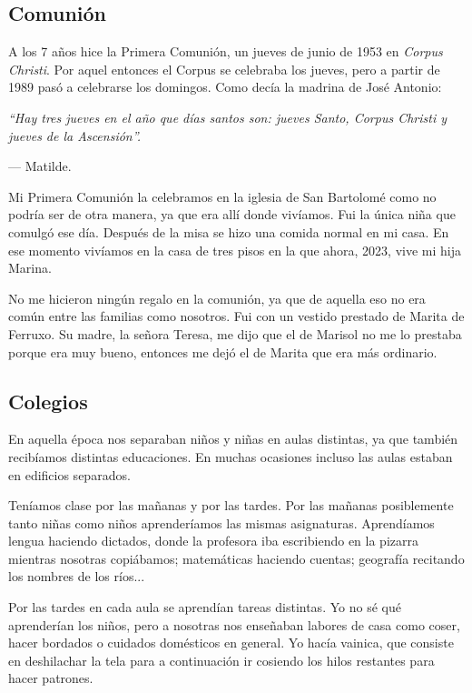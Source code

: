 \documentclass[12pt,a5paper]{book}
\begin{document}
\subsection*{Comunión}

A los 7 años hice la Primera Comunión, un jueves de junio de 1953 en \textit{Corpus Christi}. Por aquel entonces el Corpus se celebraba los jueves, pero a partir de 1989 pasó a celebrarse los domingos. Como decía la madrina de José Antonio:
\begin{center}
\textit{``Hay tres jueves en el año que días santos son: jueves Santo, Corpus Christi y jueves de la Ascensión''.}
\begin{flushright}
  — Matilde.
\end{flushright}
\end{center}

Mi Primera Comunión la celebramos en la iglesia de San Bartolomé como no podría ser de otra manera, ya que era allí donde vivíamos. Fui la única niña que comulgó ese día. Después de la misa se hizo una comida normal en mi casa. En ese momento vivíamos en la casa de tres pisos en la que ahora, 2023, vive mi hija Marina.

No me hicieron ningún regalo en la comunión, ya que de aquella eso no era común entre las familias como nosotros. Fui con un vestido prestado de Marita de Ferruxo. Su madre, la señora Teresa, me dijo que el de Marisol no me lo prestaba porque era muy bueno, entonces me dejó el de Marita que era más ordinario.


\subsection*{Colegios}

En aquella época nos separaban niños y niñas en aulas distintas, ya que también recibíamos distintas educaciones. En muchas ocasiones incluso las aulas estaban en edificios separados. 

Teníamos clase por las mañanas y por las tardes. Por las mañanas posiblemente tanto niñas como niños aprenderíamos las mismas asignaturas. Aprendíamos lengua haciendo dictados, donde la profesora iba escribiendo en la pizarra mientras nosotras copiábamos; matemáticas haciendo cuentas; geografía recitando los nombres de los ríos...

Por las tardes en cada aula se aprendían tareas distintas. Yo no sé qué aprenderían los niños, pero a nosotras nos enseñaban labores de casa como coser, hacer bordados o cuidados domésticos en general. Yo hacía vainica, que consiste en deshilachar la tela para a continuación ir cosiendo los hilos restantes para hacer patrones.
\end{document}
